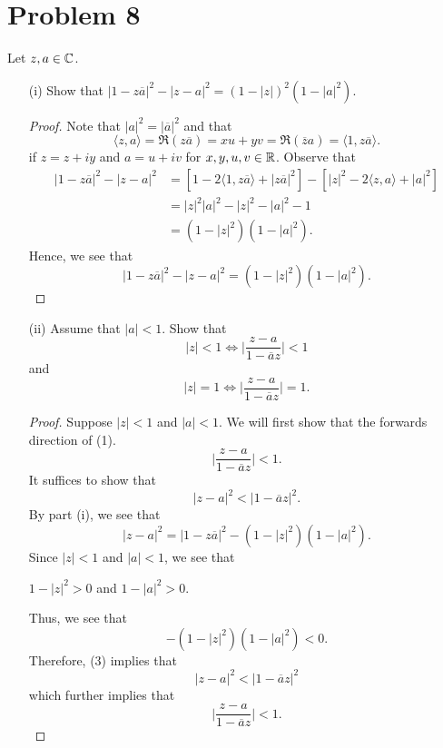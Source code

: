 \documentclass[a4paper]{article}
\begin{document}
    \section*{Problem 8} Let \( z,a \in \mathbb{C}  \). 
        \begin{enumerate}
            \item[(i)] Show that \( |  1 - z \overline{a} |^{2} - | z - a  |^{2} = (1 - | z | )^{2} (1 - | a |^{2}) \).
                \begin{proof}
                Note that \( | a  |^{2} = | \overline{a} |^{2}  \) and that  
                \[ \langle z  , a  \rangle = \Re(z \overline{a}) = x u + yv =   \Re(\overline{z} a ) = \langle 1  ,  z \overline{a} \rangle. \]
                if \( z = z + iy \) and \( a = u + iv  \) for \( x,y,u,v \in \mathbb{R}  \).
                Observe that 
                \begin{align*}
                    |  1 - z \overline{a} |^{2} - | z - a  |^{2} &= [ 1 - 2 \langle 1  , z \overline{a} \rangle + | z \overline{a} |^{2}] - [ | z  |^{2} - 2 \langle z , a \rangle + | a |^{2}] \\
                                                                 &=  | z  |^{2} | a |^{2} - | z |^{2} - | a |^{2} - 1  \\ 
                                                                 &= (1 - | z |^{2})(1 - | a |^{2}).
                \end{align*}
                Hence, we see that 
                \[  |  1 - z \overline{a} |^{2} - | z - a  |^{2} = (1 - | z |^{2})(1 - | a |^{2}). \]
                \end{proof}
            \item[(ii)] Assume that \( | a  |  < 1  \). Show that 
                \[  | z  |  < 1 \iff \Big| \frac{ z - a  }{ 1 - \overline{a} z  } \Big| < 1     \tag{1}\]
                and
                \[  | z  |  = 1 \iff \Big| \frac{ z - a  }{  1 - \overline{a} z  }  \Big|  = 1. \tag{2} \]
                \begin{proof}
                Suppose \( |  z  | < 1  \) and \( | a  |  < 1  \). We will first show that  the forwards direction of (1).
                \[  \Big|  \frac{  z - a  }{ 1 - \overline{a} z  }  \Big| < 1.  \]
                It suffices to show that 
                \[  | z - a  |^{2} < | 1 - \overline{a}z |^{2}.  \]
                By part (i), we see that 
                \[  | z - a  |^{2} = | 1 - z \overline{a} |^{2} - (1 - | z |^{2})(1 - | a |^{2}). \tag{3}\]
                Since \( | z  |  < 1  \) and \( | a  |  < 1  \), we see that 
                \begin{center}
                    \( 1 - | z  |^{2} > 0  \) and \( 1 - | a |^{2} > 0 \). 
                \end{center}
                Thus, we see that 
                \[  -(1-| z |^{2} )(1 - | a |^{2}) < 0. \]
                Therefore, (3) implies that 
                \[  | z - a  |^{2} < | 1 - \overline{a}z  |^{2} \]
                which further implies that 
                \[  \Big| \frac{ z - a  }{ 1 - \overline{a}z }  \Big| < 1. \]


\end{proof}
\end{enumerate}
\end{document}
